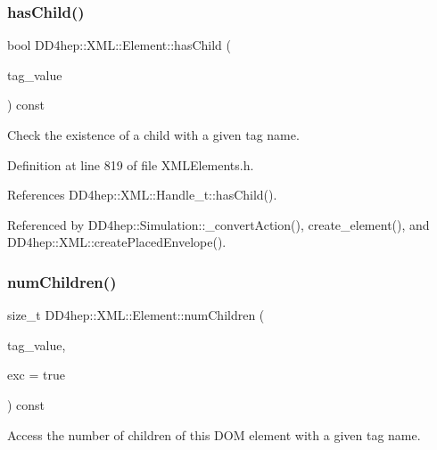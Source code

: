 \subsubsection{\texorpdfstring{has\+Child()}{hasChild()}}
{\footnotesize\ttfamily bool D\+D4hep\+::\+X\+M\+L\+::\+Element\+::has\+Child (\begin{DoxyParamCaption}\item[{const \hyperlink{namespace_d_d4hep_1_1_x_m_l_a09e5d9cc86ed782f6826dfe0778c1815}{Xml\+Char} $\ast$}]{tag\+\_\+value }\end{DoxyParamCaption}) const\hspace{0.3cm}{\ttfamily [inline]}}



Check the existence of a child with a given tag name. 



Definition at line 819 of file X\+M\+L\+Elements.\+h.



References D\+D4hep\+::\+X\+M\+L\+::\+Handle\+\_\+t\+::has\+Child().



Referenced by D\+D4hep\+::\+Simulation\+::\+\_\+convert\+Action(), create\+\_\+element(), and D\+D4hep\+::\+X\+M\+L\+::create\+Placed\+Envelope().

\hypertarget{class_d_d4hep_1_1_x_m_l_1_1_element_a48edbe33bd58d2d5aeb6549ed4036d7c}{}\label{class_d_d4hep_1_1_x_m_l_1_1_element_a48edbe33bd58d2d5aeb6549ed4036d7c} 
\subsubsection{\texorpdfstring{num\+Children()}{numChildren()}}
{\footnotesize\ttfamily size\+\_\+t D\+D4hep\+::\+X\+M\+L\+::\+Element\+::num\+Children (\begin{DoxyParamCaption}\item[{const \hyperlink{namespace_d_d4hep_1_1_x_m_l_a09e5d9cc86ed782f6826dfe0778c1815}{Xml\+Char} $\ast$}]{tag\+\_\+value,  }\item[{bool}]{exc = {\ttfamily true} }\end{DoxyParamCaption}) const\hspace{0.3cm}{\ttfamily [inline]}}



Access the number of children of this D\+OM element with a given tag name. 



